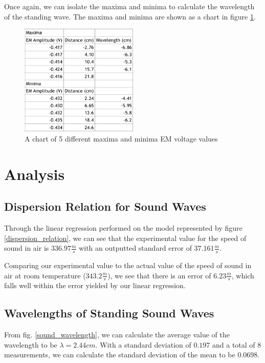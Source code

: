 \documentclass{article}
\begin{document}
Once again, we can isolate the maxima and minima to calculate the wavelength of
the standing wave. The maxima and minima are shown as a chart in figure
\ref{em_wavelength}.

\begin{figure}[H]
    \centering
    \includegraphics[width=0.5\textwidth]{charts/em_wavelength}
    \caption{A chart of 5 different maxima and minima EM voltage values}
    \label{em_wavelength}
\end{figure}

\section{Analysis}

\subsection{Dispersion Relation for Sound Waves}

Through the linear regression performed on the model represented by figure
\ref{dispersion_relation}, we can see that the experimental value for the speed
of sound in air is $336.97\frac{m}{s}$ with an outputted standard error of
$37.161\frac{m}{s}$.

Comparing our experimental value to the actual value of the speed of sound in
air at room temperature ($343.2\frac{m}{s}$), we see that there is an error of
$6.23\frac{m}{s}$, which falls well within the error yielded by our linear
regression.

\subsection{Wavelengths of Standing Sound Waves}

From fig. \ref{sound_wavelength}, we can calculate the average value of
the wavelength to be $\lambda = 2.44cm$. With a standard deviation of $0.197$
and a total of $8$ measurements, we can calculate the standard deviation of the
mean to be $0.0698$.
\end{document}
